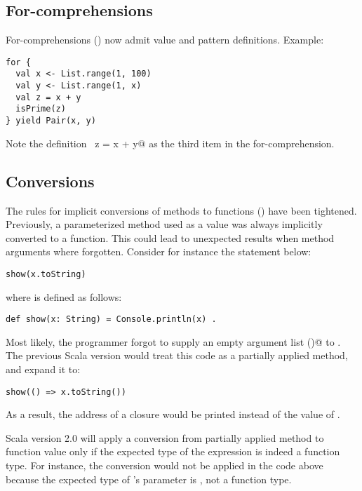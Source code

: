 \subsection*{For-comprehensions}

For-comprehensions () now admit value and
pattern definitions. Example:
\begin{lstlisting}
for {
  val x <- List.range(1, 100)
  val y <- List.range(1, x)
  val z = x + y
  isPrime(z)
} yield Pair(x, y)
\end{lstlisting}
Note the definition ~\lstinline@val z = x + y@ as the third item in
the for-comprehension. 

\subsection*{Conversions}

The rules for implicit conversions of methods to functions
() have been tightened. Previously, a
parameterized method used as a value was always implicitly converted
to a function. This could lead to unexpected results when method
arguments where forgotten. Consider for instance the statement below:
\begin{lstlisting}
show(x.toString)
\end{lstlisting}
where \lstinline@show@ is defined as follows:
\begin{lstlisting}
def show(x: String) = Console.println(x) .
\end{lstlisting}
Most likely, the programmer forgot to supply an empty argument list
\lstinline@()@ to \lstinline@toString@. The previous Scala version would
treat this code as a partially applied method, and expand it to:
\begin{lstlisting}
show(() => x.toString())
\end{lstlisting}
As a result, the address of a closure would be printed instead of the
value of \lstinline@s@.

Scala version 2.0 will apply a conversion from partially applied
method to function value only if the expected type of the expression
is indeed a function type. For instance, the conversion would not be
applied in the code above because the expected type of
\lstinline@show@'s parameter is \lstinline@String@, not a function
type. 

